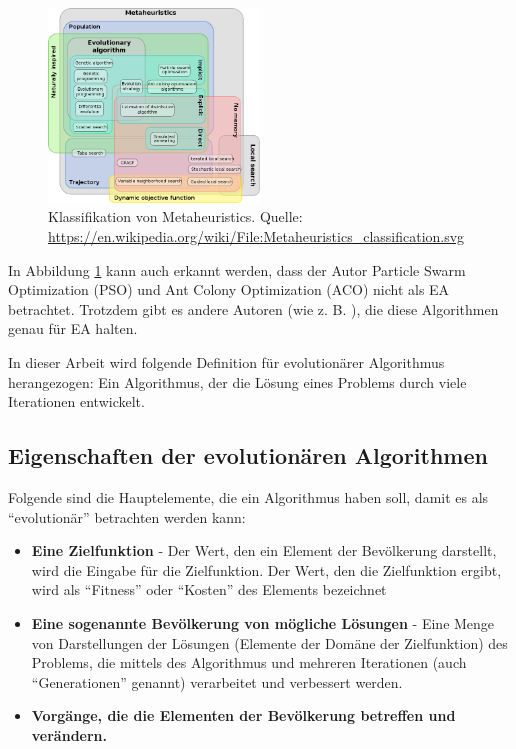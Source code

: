 \documentclass[twoside,twocolumn]{article}
\begin{document}
\begin{figure}
\caption{Klassifikation von Metaheuristics. Quelle: \url{https://en.wikipedia.org/wiki/File:Metaheuristics_classification.svg}}
\label{fig:metaheuristics}
\centering
\includegraphics[width=0.5\textwidth]{images/metaheuristics_classification.png}
\end{figure}

In Abbildung \ref{fig:metaheuristics} kann auch erkannt werden, dass der Autor Particle Swarm Optimization (PSO) und Ant Colony Optimization (ACO) nicht als EA betrachtet. Trotzdem gibt es andere Autoren (wie z. B. \cite{wiley_evolutionary}), die diese Algorithmen genau für EA halten.\par

In dieser Arbeit wird folgende Definition für evolutionärer Algorithmus herangezogen: Ein Algorithmus, der die Lösung eines Problems durch viele Iterationen entwickelt.

\subsection{Eigenschaften der evolutionären Algorithmen}
Folgende sind die Hauptelemente, die ein Algorithmus haben soll, damit es als \enquote{evolutionär} betrachten werden kann:

\begin{itemize}
\item{\textbf{Eine Zielfunktion} - Der Wert, den ein Element der Bevölkerung darstellt, wird die Eingabe für die Zielfunktion. Der Wert, den die Zielfunktion ergibt, wird als \enquote{Fitness} oder \enquote{Kosten} des Elements bezeichnet}
\item{\textbf{Eine sogenannte Bevölkerung von mögliche Lösungen} - Eine Menge von Darstellungen der Lösungen (Elemente der Domäne der Zielfunktion) des Problems, die mittels des Algorithmus und mehreren Iterationen (auch \enquote{Generationen} genannt) verarbeitet und verbessert werden.}
\item{\textbf{Vorgänge, die die Elementen der Bevölkerung betreffen und verändern.}}
\end{itemize}
\end{document}

